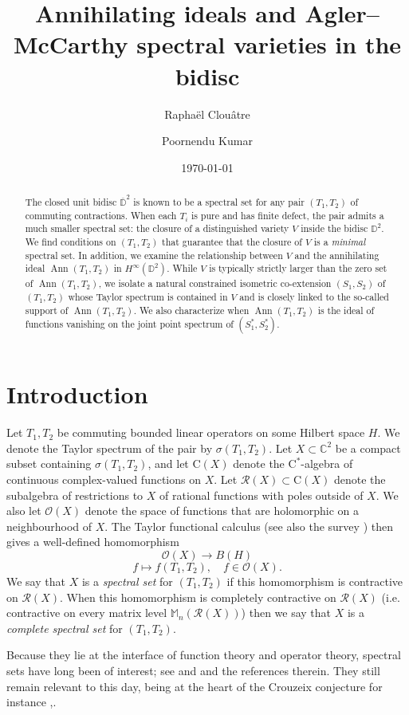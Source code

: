 \documentclass[10pt]{amsart}
\date{\today}
\author{Rapha\"el Clou\^atre}
\author{Poornendu Kumar}
\title[Agler--McCarthy spectral varieties in the bidisc]{Annihilating ideals and Agler--McCarthy spectral varieties in the bidisc}
\newcommand{\bC}{{\mathbb{C}}}
\newcommand{\bD}{{\mathbb{D}}}
\newcommand{\bM}{{\mathbb{M}}}
\renewcommand{\O}{{\mathcal{O}}}
\newcommand{\R}{{\mathcal{R}}}
\newcommand{\rC}{\mathrm{C}}
\newcommand{\ol}{\overline}
\newcommand{\Ann}{\operatorname{Ann}}
\theoremstyle{definition}
\begin{document}
\begin{abstract}
The closed unit bidisc $\ol{\bD}^2$ is known to be a spectral set for any pair $(T_1,T_2)$ of commuting contractions. When each $T_i$ is pure and has finite defect, the pair  admits a much smaller spectral set: the closure of a distinguished variety $V$ inside the bidisc $\bD^2$. We find conditions on $(T_1,T_2)$ that guarantee that  the closure of $V$ is a \emph{minimal} spectral set. In addition, we examine the relationship between $V$ and  the annihilating ideal $\Ann(T_1,T_2)$ in $H^\infty(\bD^2)$. While $V$ is typically strictly larger than the zero set of $\Ann(T_1,T_2)$, we isolate a natural constrained  isometric co-extension $(S_1,S_2)$ of $(T_1,T_2)$ whose Taylor spectrum is contained in $V$ and is closely linked to the so-called support of $\Ann(T_1,T_2)$.  We also characterize when $\Ann(T_1,T_2)$ is the ideal of functions vanishing on the joint point spectrum of $(S_1^*,S_2^*)$. 
\end{abstract}
\maketitle

\section{Introduction}

Let $T_1,T_2$ be commuting bounded linear operators on some Hilbert space $H$. We  denote the  Taylor spectrum  of the pair  by $\sigma(T_1,T_2)$. 
Let $X\subset \bC^2$ be a compact subset containing $\sigma(T_1,T_2)$, and let $\rC(X)$ denote the $\rC^*$-algebra of continuous complex-valued functions on $X$.  Let $\R(X)\subset \rC(X)$ denote the subalgebra of restrictions to $X$ of rational functions with poles outside of $X$.  We also let $\O(X)$ denote the space of functions that are holomorphic on a neighbourhood of $X$. The Taylor functional calculus \cite[Theorem 30.7]{muller2007} (see also the survey \cite{Cur}) then gives a well-defined homomorphism
\[
\O(X)\to B(H)
\]
\[
f\mapsto f(T_1,T_2), \quad f\in \O(X).
\]
We say that $X$ is a \emph{spectral set} for $(T_1,T_2)$ if this homomorphism is contractive on $\R(X)$. When this homomorphism is completely contractive on $\R(X)$ (i.e. contractive on every matrix level $\bM_n(\R(X))$) then we say that $X$ is a \emph{complete spectral set} for $(T_1,T_2)$.

Because they lie at the interface of function theory and operator theory, spectral sets have long been of interest; see  \cite{paulsen2002} and \cite[Chapter 37]{handbookLA2014} and the references therein. They still remain relevant to this day, being at the heart of the Crouzeix conjecture for instance \cite{crouzeix2004},\cite{crouzeix2007}.
\end{document}
